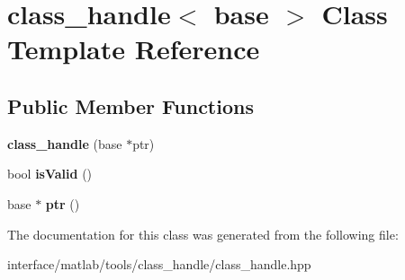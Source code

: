 \hypertarget{classclass__handle}{}\section{class\+\_\+handle$<$ base $>$ Class Template Reference}
\label{classclass__handle}
\subsection*{Public Member Functions}
\begin{DoxyCompactItemize}
\item 
{\bfseries class\+\_\+handle} (base $\ast$ptr)\hypertarget{classclass__handle_ac68e361cb6bce4d42148e8f7f9a81f81}{}\label{classclass__handle_ac68e361cb6bce4d42148e8f7f9a81f81}

\item 
bool {\bfseries is\+Valid} ()\hypertarget{classclass__handle_af6132f4dcc9eec3ebcfe6ccb1cea857f}{}\label{classclass__handle_af6132f4dcc9eec3ebcfe6ccb1cea857f}

\item 
base $\ast$ {\bfseries ptr} ()\hypertarget{classclass__handle_a770ba105e71c5b331ce2144fd570a603}{}\label{classclass__handle_a770ba105e71c5b331ce2144fd570a603}

\end{DoxyCompactItemize}


The documentation for this class was generated from the following file\+:\begin{DoxyCompactItemize}
\item 
interface/matlab/tools/class\+\_\+handle/class\+\_\+handle.\+hpp\end{DoxyCompactItemize}
